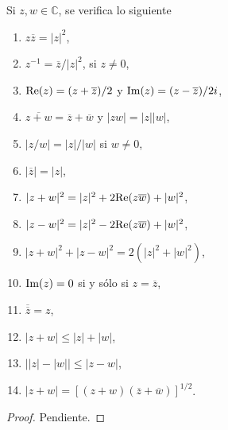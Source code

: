 

\begin{theorem}
Si $z, w \in \mathbb{C}$, se verifica lo siguiente
\begin{multicols}{2}
    \begin{enumerate}[label=\textnormal{(\roman*)}]
    \item $z \overline{z} = |z|^2$,
    \item $z^{-1} = \overline{z}/|z|^2$, si $z \ne 0$,
    \item $\textnormal{Re}(z) = (z + \overline{z})/2$ y $\textnormal{Im}(z) = (z - \overline{z}) / 2i$,
    \item $\overline{z + w} = \overline{z} + \overline{w}$ y $|z w| = |z| |w|$,
    \item $|z / w| = |z| / |w|$ si $w \ne 0$,
    \item $|\overline{z}| = |z|$,
    \item $|z + w|^2 = |z|^2 + 2 \textnormal{Re}(z \overline{w}) + |w|^2$,
    \columnbreak
    \item $|z - w|^2 = |z|^2 - 2 \textnormal{Re}(z \overline{w}) + |w|^2$,
    \item $|z + w|^2 + |z - w|^2 = 2(|z|^2 + |w|^2)$,
    \item $\textnormal{Im}(z) = 0$ si y sólo si $z = \overline{z}$,
    \item $\overline{\overline{z}} = z$,
    \item $|z + w| \le |z| + |w|$,
    \item $\big| |z| - |w| \big| \le |z - w|$,
    \item $|z+w| = [(z+w)(\overline{z} + \overline{w})]^{1/2}$.
    \end{enumerate}
\end{multicols}
\end{theorem}

\begin{proof}
Pendiente.
\end{proof}
